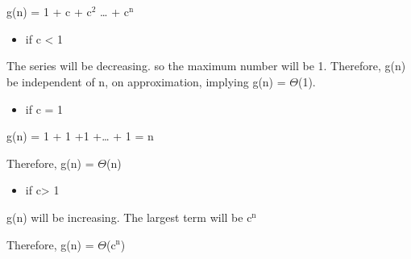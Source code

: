\documentclass{book}
\begin{document}
\section{}
\label{sec:org52e78ab}
g(n) = 1 + c + c\(^{\text{2}}\) \ldots{} + c\(^{\text{n}}\)
\begin{itemize}
\item if c < 1
\end{itemize}

The series will be decreasing. so the maximum number will be 1. Therefore, g(n) be independent of n, on approximation, implying g(n) = \(\Theta\)(1).
\begin{itemize}
\item if c = 1
\end{itemize}

g(n) = 1 + 1 +1 +\ldots{} + 1 = n

Therefore, g(n) = \(\Theta\)(n)
\begin{itemize}
\item if c> 1
\end{itemize}

g(n) will be increasing. The largest term will be c\(^{\text{n}}\)

Therefore, g(n) = \(\Theta\)(c\(^{\text{n}}\))
\end{document}
